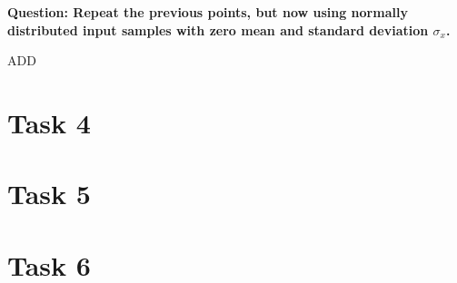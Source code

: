 \documentclass[11pt,a4paper]{article}
\begin{document}
\vspace{1cm}
\textbf{Question: Repeat the previous points, but now using normally distributed input samples with zero mean and standard deviation $\sigma_x$.
}
\vspace{0.5cm}

ADD

\vspace{0.5cm}
\section{Task 4}


\vspace{0.5cm}
\section{Task 5}


\vspace{0.5cm}
\section{Task 6}

\end{document}
